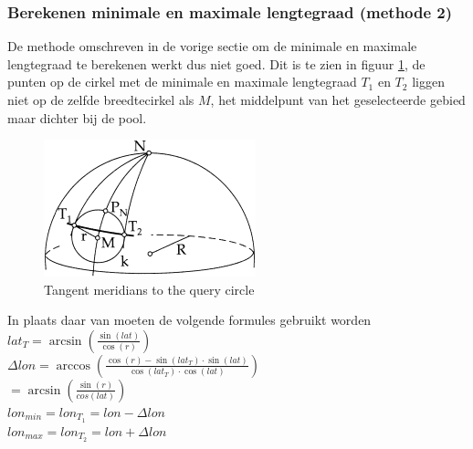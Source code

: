 \documentclass[twoside,openright]{uva-bachelor-thesis}
\begin{document}
		\subsubsection{Berekenen minimale en maximale lengtegraad (methode 2)}
		De methode omschreven in de vorige sectie om de minimale en maximale lengtegraad te berekenen werkt dus niet goed. Dit is te zien in figuur \ref{fig:tangentpoints}, de punten op de cirkel met de minimale en maximale lengtegraad $T_1$ en $T_2$ liggen niet op de zelfde breedtecirkel \cite{circlelat} als $M$, het middelpunt van het geselecteerde gebied maar dichter bij de pool.
		\begin{figure}[!htb]
			\centering
			\includegraphics[scale=1.0]{./img/TangentPoints.png}
			\caption{Tangent meridians to the query circle}
			\label{fig:tangentpoints}
		\end{figure}
		In plaats daar van moeten de volgende formules gebruikt worden
		\\[0.5cm]
		$lat_T = \arcsin(\frac{\sin(lat)}{\cos(r)})$\\
		$\Delta lon = \arccos(\frac{\cos(r) - \sin(lat_T) \cdot \sin(lat)}{\cos(lat_T) \cdot \cos(lat)})$ \\
		$= \arcsin(\frac{\sin(r)}{cos(lat)})$
		\\[0.5cm]
		$lon_{min} = lon_{T_1} = lon - \Delta lon$\\
		$lon_{max} = lon_{T_2} = lon + \Delta lon$
\end{document}
